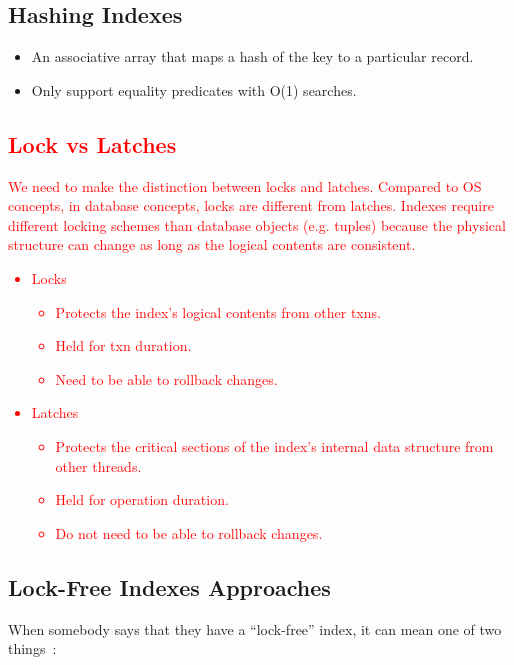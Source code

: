\documentclass[11pt]{article}
\newcommand{\rr}[1]{\textcolor{red}{#1}}
\begin{document}
\subsection*{Hashing Indexes}
\begin{itemize}
    \item
    An associative array that maps a hash of the key to a particular record.
    
    \item
    Only support equality predicates with O(1) searches.
\end{itemize}
\rr{
\subsection*{Lock vs Latches}
We need to make the distinction between locks and latches. Compared to OS concepts, in database concepts, locks are different from latches. Indexes require different locking schemes than database objects (e.g. tuples) because the physical structure can change as long as the logical contents are consistent.
\begin{itemize}
    \item Locks
    \begin{itemize}
        \item Protects the index’s logical contents from other txns.
        \item Held for txn duration.
        \item Need to be able to rollback changes.
    \end{itemize}
    \item Latches
    \begin{itemize}
        \item Protects the critical sections of the index’s internal data structure from other threads.
        \item Held for operation duration.
        \item Do not need to be able to rollback changes.
    \end{itemize}
\end{itemize}}

\subsection*{Lock-Free Indexes Approaches}
When somebody says that they have a ``lock-free'' index, it can mean one of two 
things~\cite{graefe10}:
\end{document}
